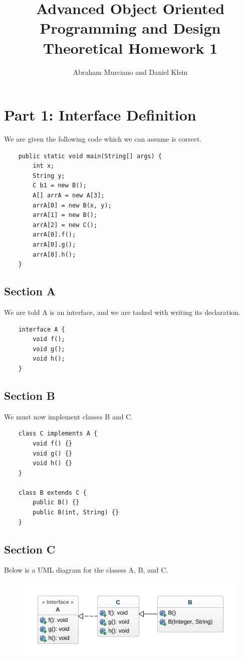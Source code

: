 \documentclass{article}
\title{Advanced Object Oriented Programming and Design\\
\medskip
\large Theoretical Homework 1}
\author{Abraham Murciano and Daniel Klein}
\begin{document}
\maketitle

\section*{Part 1: Interface Definition}

We are given the following code which we can assume is correct.

\begin{verbatim}
	public static void main(String[] args) {
	    int x;
	    String y;
	    C b1 = new B();
	    A[] arrA = new A[3];
	    arrA[0] = new B(x, y);
	    arrA[1] = new B();
	    arrA[2] = new C();
	    arrA[0].f();
	    arrA[0].g();
	    arrA[0].h();
	}
\end{verbatim}

\subsection*{Section A}

We are told A is an interface, and we are tasked with writing its declaration.

\begin{verbatim}
	interface A {
	    void f();
	    void g();
	    void h();
	}
\end{verbatim}

\subsection*{Section B}

We must now implement classes B and C.

\begin{verbatim}
	class C implements A {
	    void f() {}
	    void g() {}
	    void h() {}
	}

	class B extends C {
	    public B() {}
	    public B(int, String) {}
	}
\end{verbatim}

\subsection*{Section C}

Below is a UML diagram for the classes A, B, and C.

\begin{figure}[htbp]
	\centering
	\includegraphics[width=\textwidth]{uml.png}
\end{figure}
\end{document}
